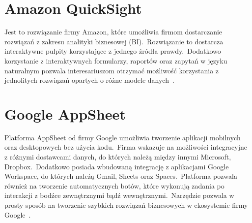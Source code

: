 \section{Amazon QuickSight}
Jest to rozwiązanie firmy Amazon, które umożliwia firmom dostarczanie rozwiązań z zakresu analityki biznesowej  (BI).\ Rozwiązanie to dostarcza interaktywne pulpity korzystające z jednego źródła prawdy.\ Dodatkowo korzystanie z interaktywnych formularzy, raportów oraz zapytań w języku naturalnym pozwala interesariuszom otrzymać możliwość korzystania z jednolitych rozwiązań opartych o różne modele danych~\cite{AmazonQuickSight}.

\section{Google AppSheet}
Platforma AppSheet od firmy Google umożliwia tworzenie aplikacji mobilnych oraz desktopowych bez użycia kodu.\ Firma wskazuje na możliwości integracyjne z różnymi dostawcami danych, do których należą między innymi Microsoft, Dropbox.\ Dodatkowo posiada wbudowaną integrację z aplikacjami Google Workspace, do których należą Gmail, Sheets oraz Spaces.\ Platforma pozwala również na tworzenie automatycznych botów, które wykonują zadania po interakcji z bodźce zewnętrznymi bądź wewnętrznymi.\ Narzędzie pozwala w prosty sposób na tworzenie szybkich rozwiązań biznesowych w ekosystemie firmy Google~\cite{GoogleAppSheet}.

